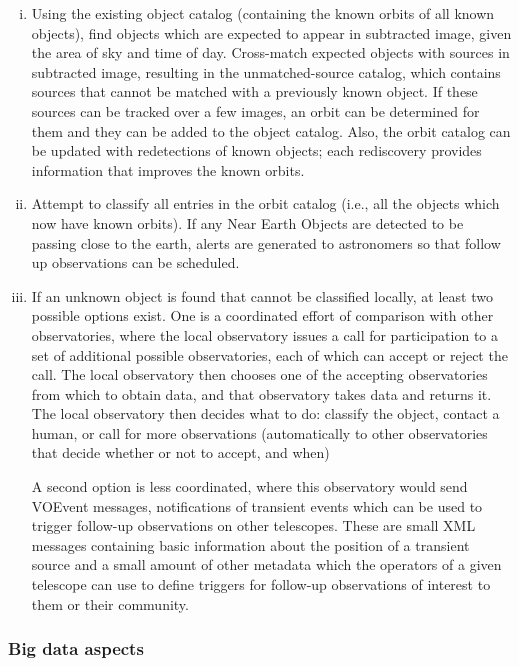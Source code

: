 \documentclass[times]{cpeauth}
\begin{document}
\begin{enumerate}[(i)]

\item Using the existing object catalog (containing the known orbits of all
known objects), find objects which are expected to appear in subtracted image,
given the area of sky and time of day.  Cross-match expected objects with
sources in subtracted image, resulting in the unmatched-source catalog, which
contains sources that cannot be matched with a previously known object.  If
these sources can be tracked over a few images, an orbit can be determined for
them and they can be added to the object catalog.  Also, the orbit catalog can
be updated with redetections of known objects; each rediscovery provides
information that improves the known orbits.

\item Attempt to classify all entries in the orbit catalog (i.e., all the
objects which now have known orbits). If any Near Earth Objects are detected to
be passing close to the earth, alerts are generated to astronomers so that
follow up observations can be scheduled.

\item If an unknown object is found that cannot be classified locally, at least
two possible options exist. One is a coordinated effort of comparison with other
observatories, where the local observatory issues a call for participation to a
set of additional possible observatories, each of which can accept or reject the
call.  The local observatory then chooses one of the accepting observatories
from which to obtain data, and that observatory takes data and returns it. The
local observatory then decides what to do: classify the object, contact a human,
or call for more observations (automatically to other observatories that decide
whether or not to accept, and when)

A second option is less coordinated, where this observatory would send VOEvent
messages, notifications of transient events which can be used to trigger
follow-up observations on other telescopes. These are small XML messages
containing basic information about the position of a transient source and a
small amount of other metadata which the operators of a given telescope can use
to define triggers for follow-up observations of interest to them or their
community.

\end{enumerate}

 \subsubsection*{Big data aspects} %
\end{document}
